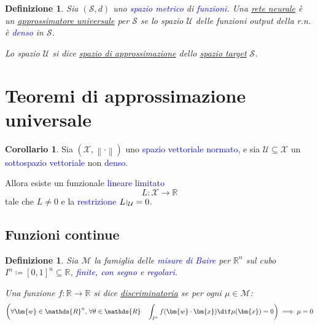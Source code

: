 \documentclass[10pt]{book}
\newcommand{\1}{\mathds{1}}
\newcommand{\R}{\mathds{R}}
\newcommand{\norma}[1]{%
\left\lVert#1\right\rVert%
}
\let\restriction\relax
\def\restriction#1#2{\mathchoice
              {\setbox1\hbox{${\displaystyle #1}_{\scriptstyle #2}$}
              \restrictionaux{#1}{#2}}
              {\setbox1\hbox{${\textstyle #1}_{\scriptstyle #2}$}
              \restrictionaux{#1}{#2}}
              {\setbox1\hbox{${\scriptstyle #1}_{\scriptscriptstyle #2}$}
              \restrictionaux{#1}{#2}}
              {\setbox1\hbox{${\scriptscriptstyle #1}_{\scriptscriptstyle #2}$}
              \restrictionaux{#1}{#2}}}
\def\restrictionaux#1#2{{#1\,\smash{\vrule height .8\ht1 depth .85\dp1}}_{\,#2}}
\theoremstyle{definition}%
\newtheorem{cor}[thm]{Corollario}
\theoremstyle{plain}
\newtheorem{definizione}[thm]{Definizione}
\theoremstyle{remark}
\renewcommand{\href}[2]{\textcolor{blue}{#2}}
\begin{document}
\begin{definizione}
Sia \((\mathcal{S}, d)\) uno \href{../../../../../org/roam/20250301193511-spazio_metrico.org}{spazio metrico} di \href{../../../../../org/roam/20250202170607-classe_relazione_binaria.org}{funzioni}. Una \hyperref[sec:org1346ff2]{rete neurale} è un \uline{approssimatore universale} per \(\mathcal{S}\) se lo spazio \(\mathcal{U}\) delle funzioni output della r.n. è \href{../../../../../org/roam/20250301193045-sottoinsieme_denso.org}{denso} in \(\mathcal{S}\).

Lo spazio \(\mathcal{U}\) si dice \uline{spazio di approssimazione} dello \uline{spazio target} \(\mathcal{S}\).
\end{definizione}
\section{Teoremi di approssimazione universale}
\label{sec:org53df96f}

\begin{cor}
Sia \((\mathcal{X}, \norma{\cdot})\) uno \href{../../../../../org/roam/20241205142027-spazio_vettoriale.org}{spazio vettoriale} \href{../../../../../org/roam/20250625123506-spazio_normato.org}{normato}, e sia \(\mathcal{U} \subseteq \mathcal{X}\) un \href{../../../../../org/roam/20250114103118-sottospazio_vettoriale.org}{sottospazio vettoriale} non \href{../../../../../org/roam/20250301193045-sottoinsieme_denso.org}{denso}.

Allora esiste un funzionale \href{../../../../../org/roam/20250114101949-funzione_lineare.org}{lineare} \href{../../../../../org/roam/20250704145518-funzione_limitata.org}{limitato}
\begin{equation*}
L:\mathcal{X}\to \R
\end{equation*}
tale che \(L\neq 0\) e la \href{../../../../../org/roam/20250205170515-restrizione_di_una_classe.org}{restrizione} \(\restriction{L}{\mathcal{U}} = 0\).
\label{lem:9.3.2}
\end{cor}
\subsection{Funzioni continue}
\label{sec:org512f32f}

\begin{definizione}
Sia \(\mathcal{M}\) la famiglia delle \href{../../../../../org/roam/20250625104200-misura_di_baire.org}{misure di Baire} per \(\R^{n}\) sul cubo \(I^{n} \coloneqq [0,1]^{n} \subseteq \R\), \href{../../../../../org/roam/20250625110016-misura_finita.org}{finite}, \href{../../../../../org/roam/20250625110024-misura_con_segno.org}{con segno} e \href{../../../../../org/roam/20250625110032-misura_regolare.org}{regolari}.

Una funzione \(f: \R\to \R\) si dice \uline{discriminatoria} se per ogni \(\mu \in \mathcal{M}\):
\begin{equation*}
\left(\forall \bm{w} \in \R^{n},\, \forall \theta \in \R\quad \int_{I^{n}} f(\bm{w}\cdot\bm{x}) \dif \mu(\bm{x}) = 0\right)\implies \mu=0
\end{equation*}
\end{definizione}
\end{document}
